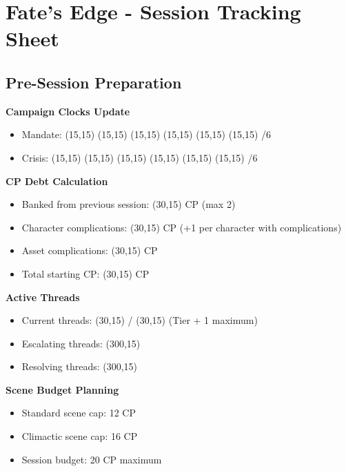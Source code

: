 \documentclass[11pt,letterpaper]{article}
\begin{document}
\section*{Fate's Edge - Session Tracking Sheet}

\subsection{Pre-Session Preparation}

\noindent\textbf{Campaign Clocks Update}
\begin{itemize}[leftmargin=*]
    \item Mandate: \framebox(15,15){} \framebox(15,15){} \framebox(15,15){} \framebox(15,15){} \framebox(15,15){} \framebox(15,15){} /6
    \item Crisis: \framebox(15,15){} \framebox(15,15){} \framebox(15,15){} \framebox(15,15){} \framebox(15,15){} \framebox(15,15){} /6
\end{itemize}

\vspace{0.3cm}

\noindent\textbf{CP Debt Calculation}
\begin{itemize}[leftmargin=*]
    \item Banked from previous session: \framebox(30,15){} CP (max 2)
    \item Character complications: \framebox(30,15){} CP (+1 per character with complications)
    \item Asset complications: \framebox(30,15){} CP
    \item Total starting CP: \framebox(30,15){} CP
\end{itemize}

\vspace{0.3cm}

\noindent\textbf{Active Threads}
\begin{itemize}[leftmargin=*]
    \item Current threads: \framebox(30,15){} / \framebox(30,15){} (Tier + 1 maximum)
    \item Escalating threads: \framebox(300,15){} 
    \item Resolving threads: \framebox(300,15){}
\end{itemize}

\vspace{0.3cm}

\noindent\textbf{Scene Budget Planning}
\begin{itemize}[leftmargin=*]
    \item Standard scene cap: 12 CP
    \item Climactic scene cap: 16 CP
    \item Session budget: 20 CP maximum
\end{itemize}
\end{document}
